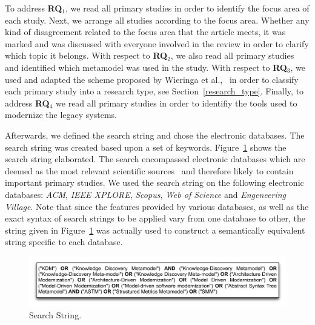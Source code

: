 

To address \textbf{RQ$_1$}, we read all primary studies in order to identify the focus area of each study. Next, we arrange all studies according to the focus area. Whether any kind of disagreement related to the focus area that the article meets, it was marked and was discussed with everyone involved in the review in order to clarify which topic it belongs. With respect to \textbf{RQ$_2$}, we also read all primary studies and identified which metamodel was used in the study. With respect to \textbf{RQ$_3$}, we used and adapted the scheme proposed by Wieringa et al.,~\cite{Wieringa:2005:REP:1107677.1107683} in order to classify each primary study into a research type, see Section~\ref{research_type}. Finally, to address \textbf{RQ$_4$} we read all primary studies in order to identifiy the tools used to modernize the legacy systems. %


Afterwards, we defined the search string and chose the electronic databases. The search string was created based upon a set of keywords. Figure~\ref{search_string} shows the search string elaborated. The search encompassed electronic databases which are deemed as the most relevant scientific sources~\cite{Kitchenham} and therefore likely to contain important primary studies. We used the search string on the following electronic databases: \textit{ACM}, \textit{IEEE XPLORE}, \textit{Scopus}, \textit{Web of Science} and \textit{Engeneering Village}. Note that since the features provided by various databases, as well as the exact syntax of search strings to be applied vary from one database to other, the string given in Figure~\ref{search_string} was actually used to construct a semantically equivalent string specific to each database.


\begin{figure}[!h]
\centering
  \includegraphics[scale=0.35]{figuras/SearchStringADM}
\caption{Search String.}
\label{search_string}
\end{figure} 

